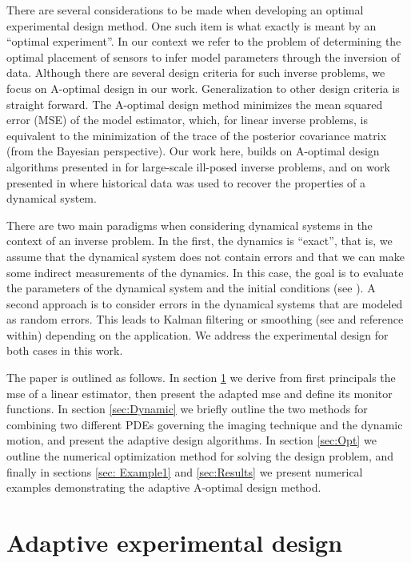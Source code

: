 \documentclass[11pt]{article}
\begin{document}
There are several considerations to be made when developing an optimal experimental design method. One such item is what exactly is meant by an ``optimal experiment''. In our context we refer to the problem of determining  the optimal placement of sensors to infer model parameters  through the inversion of  data. 
 Although there are several design criteria for such inverse problems,  we focus on A-optimal design in our work.
 Generalization to other design criteria is straight forward. 
 The A-optimal design method minimizes the mean squared error (MSE) of the model estimator, which, for linear inverse problems, is equivalent to the minimization of  the trace of the posterior covariance matrix (from the Bayesian perspective). Our work here, builds on A-optimal design algorithms presented in \cite{HaberMagnantLuceroTenorio12} for large-scale ill-posed inverse problems, and on work presented in \cite{Fohring2014} where historical data was used
 to recover the properties of a dynamical system. 

There are two main paradigms when considering dynamical systems in the context of an inverse problem. In the
first, the dynamics is ``exact'', that is, we assume that the dynamical system does not contain errors and that we can make some indirect measurements of the dynamics. In this case,
the goal is to evaluate the parameters of the dynamical system and the initial conditions (see \cite{Fohring2014}). 
A second approach  is
to consider errors in the dynamical systems that are modeled as random errors. This leads to 
Kalman filtering or smoothing (see \cite{kalman,Aravkin2010} and reference within) depending on the application.
 We address the experimental design for  both cases in this work. 

\bigskip


The paper is outlined as follows. In section \ref{sec: Adaptive} we derive from first principals the mse of a linear estimator, then present the adapted mse and define its monitor functions. In section \ref{sec:Dynamic} we briefly outline the two methods for combining two different PDEs governing the imaging technique and the dynamic motion, and present the adaptive design algorithms.  
In section \ref{sec:Opt} we outline the numerical optimization method for solving the design problem, and finally in sections \ref{sec: Example1} and \ref{sec:Results} we present  numerical examples demonstrating the adaptive A-optimal design method. 




\section{ Adaptive experimental design }
\label{sec: Adaptive}
\end{document}
